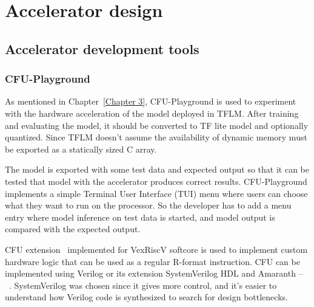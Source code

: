 
\chapter{Accelerator design} \label{Chapter 5}

\section{Accelerator development tools }

\subsection{CFU-Playground}

As mentioned in Chapter~\ref{Chapter 3}, CFU-Playground is used to experiment with the hardware acceleration of the model deployed in TFLM. After training and evaluating the model, it should be converted to TF lite model and optionally quantized. Since TFLM doesn't assume the availability of dynamic memory must be exported as a statically sized C array. 

The model is exported with some test data and expected output so that it can be tested that model with the accelerator produces correct results. CFU-Playground implements a simple Terminal User Interface (TUI) menu where users can choose what they want to run on the processor. So the developer has to add a menu entry where model inference on test data is started, and model output is compared with the expected output.

CFU extension~\cite{risc_v_cfu} implemented for VexRiscV softcore is used to implement custom hardware logic that can be used as a regular R-format instruction. CFU can be implemented using Verilog or its extension SystemVerilog HDL and Amaranth -- ~\cite{amaranth}. SystemVerilog was chosen since it gives more control, and it's easier to understand how Verilog code is synthesized to search for design bottlenecks.  

